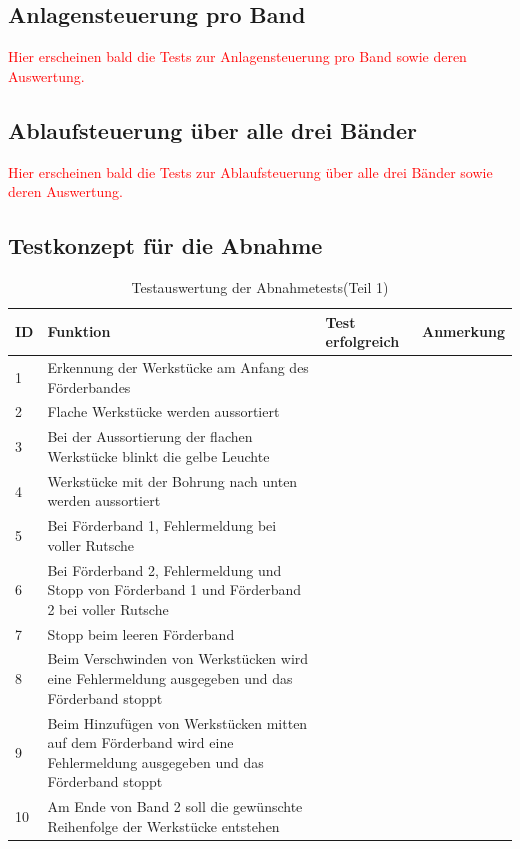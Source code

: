 \documentclass[a4paper, 11pt]{article}
\begin{document}
\subsection{Anlagensteuerung pro Band}
\textcolor{red}{Hier erscheinen bald die Tests zur Anlagensteuerung pro Band sowie deren Auswertung.}

\subsection{Ablaufsteuerung über alle drei Bänder}
\textcolor{red}{Hier erscheinen bald die Tests zur Ablaufsteuerung über alle drei Bänder sowie deren Auswertung.}

\subsection{Testkonzept für die Abnahme} 
\begin{table}[h]
\center
\begin{tabularx}{\textwidth}{|l|X|X|X|}
\hline
\textbf{ID}&\textbf{Funktion}&\textbf{Test erfolgreich}&\textbf{Anmerkung}\\
\hline
1&Erkennung der Werkstücke am Anfang des Förderbandes&&\\
\hline
2&Flache Werkstücke werden aussortiert&&\\
\hline
3&Bei der Aussortierung der flachen Werkstücke blinkt die gelbe Leuchte&&\\
\hline
4&Werkstücke mit der Bohrung nach unten werden aussortiert&&\\
\hline
5&Bei Förderband 1, Fehlermeldung bei voller Rutsche&&\\
\hline
6&Bei Förderband 2, Fehlermeldung und Stopp von Förderband 1 und Förderband 2 bei voller Rutsche&&\\
\hline
7&Stopp beim leeren Förderband&&\\
\hline
8&Beim Verschwinden von Werkstücken wird eine Fehlermeldung ausgegeben und das Förderband stoppt&&\\
\hline
9&Beim Hinzufügen von Werkstücken mitten auf dem Förderband wird eine Fehlermeldung ausgegeben und das Förderband stoppt&&\\
\hline
10&Am Ende von Band 2 soll die gewünschte Reihenfolge der Werkstücke entstehen&&\\
\hline
\end{tabularx}
\caption{Testauswertung der Abnahmetests(Teil 1)}
\label{tstl1}
\end{table}
\end{document}
